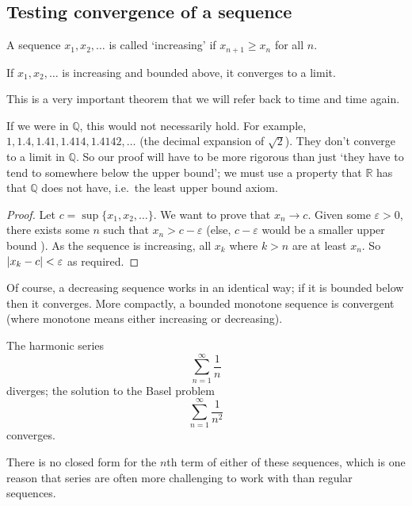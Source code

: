 \subsection{Testing convergence of a sequence}
A sequence \(x_1, x_2, \dots\) is called `increasing' if \(x_{n+1} \geq x_n\) for all \(n\).
\begin{theorem}
	If \(x_1, x_2, \dots\) is increasing and bounded above, it converges to a limit.
\end{theorem}
This is a very important theorem that we will refer back to time and time again.
\begin{note}
	If we were in \(\mathbb Q\), this would not necessarily hold.
	For example, \(1, 1.4, 1.41, 1.414, 1.4142, \dots\) (the decimal expansion of \(\sqrt{2}\)).
	They don't converge to a limit in \(\mathbb Q\).
	So our proof will have to be more rigorous than just `they have to tend to somewhere below the upper bound'; we must use a property that \(\mathbb R\) has that \(\mathbb Q\) does not have, i.e.\ the least upper bound axiom.
\end{note}
\begin{proof}
	Let \(c = \sup \{ x_1, x_2, \dots \}\).
	We want to prove that \(x_n \to c\).
	Given some \(\varepsilon > 0\), there exists some \(n\) such that \(x_n > c - \varepsilon\) (else, \(c - \varepsilon\) would be a smaller upper bound \contradiction).
	As the sequence is increasing, all \(x_k\) where \(k > n\) are at least \(x_n\).
	So \(\abs{x_k - c} < \varepsilon\) as required.
\end{proof}
Of course, a decreasing sequence works in an identical way; if it is bounded below then it converges.
More compactly, a bounded monotone sequence is convergent (where monotone means either increasing or decreasing).
\begin{proposition}
	The harmonic series
	\[
		\sum_{n=1}^\infty \frac 1 n
	\]
	diverges; the solution to the Basel problem
	\[
		\sum_{n=1}^\infty \frac 1 {n^2}
	\]
	converges.
\end{proposition}
There is no closed form for the \(n\)th term of either of these sequences, which is one reason that series are often more challenging to work with than regular sequences.
